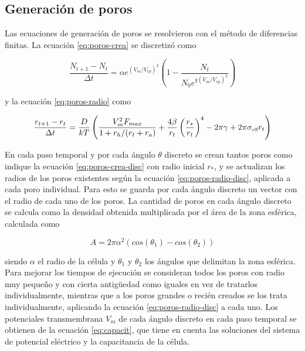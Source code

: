 \documentclass[a4paper,10pt]{article}
\begin{document}

\subsection{Generación de poros}

Las ecuaciones de generación de poros se resolvieron con el método de diferencias finitas. La ecuación \ref{eq:poros-crea} se discretizó como

\begin{equation} \label{eq:poros-crea-disc}
	\frac{N_{t+1} - N_{t}}{\Delta t} = \alpha e^{(V_m/V_{ep})^2} \left( 1 - \frac{N_{t}}{N_0 e^{q \left(V_m / V_{ep} \right) ^2}} \right)
\end{equation}

y la ecuación \ref{eq:poros-radio} como

\begin{equation} \label{eq:poros-radio-disc}
	\frac{r_{t+1} - r_t}{\Delta t} = \frac{D}{kT} \left( \frac{V_m^2 F_{max}}{1+r_h / (r_t+r_a)} + \frac{4 \beta}{r_t} \left(\frac{r_*}{r_t}\right)^4 - 2 \pi \gamma + 2 \pi \sigma_{\textrm{\tiny eff}} r_t \right)
\end{equation}

En cada paso temporal y por cada ángulo $\theta$ discreto se crean tantos poros como indique la ecuación \ref{eq:poros-crea-disc} con radio inicial $r_*$, y se actualizan los radios de los poros existentes según la ecuación \ref{eq:poros-radio-disc}, aplicada a cada poro individual. Para esto se guarda por cada ángulo discreto un vector con el radio de cada uno de los poros. La cantidad de poros en cada ángulo discreto se calcula como la densidad obtenida multiplicada por el área de la zona esférica, calculada como 

\begin{equation} \label{eq:area}
	A = 2 \pi \alpha^2 (cos(\theta_1) - cos(\theta_2))
\end{equation}

siendo $\alpha$ el radio de la célula y $\theta_1$ y $\theta_2$ los ángulos que delimitan la zona esférica.\\

Para mejorar los tiempos de ejecución se consideran todos los poros con radio muy pequeño y con cierta antigüedad como iguales en vez de tratarlos individualmente, mientras que a los poros grandes o recién creados se los trata individualmente, aplicando la ecuación \ref{eq:poros-radio-disc} a cada uno. Los potenciales transmembrana $V_m$ de cada ángulo discreto en cada paso temporal se obtienen de la ecuación \ref{eq:capacit}, que tiene en cuenta las soluciones del sistema de potencial eléctrico y la capacitancia de la célula.\\
\end{document}
